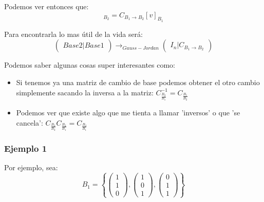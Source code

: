 \documentclass[12pt]{report}							    %
\begin{document}
        Podemos ver entonces que:
        \begin{equation*}
            [v]_{B_2} = C_{B_1 \to B_2} [v]_{B_1}
        \end{equation*}

        Para encontrarla lo mas útil de la vida será:
        \begin{equation}
            \begin{pmatrix}  Base 2  \vert Base 1 \end{pmatrix} \to_{Gauss-Jordan}
            \begin{pmatrix}  I_n  \vert C_{B_1 \to B_2} \end{pmatrix}
        \end{equation}


        Podemos saber algunas cosas super interesantes como:
        \begin{itemize}
            \item Si tenemos ya una matriz de cambio de base podemos obtener el otro cambio simplemente sacando la inversa a la matriz:
            $ C^{-1}_{\frac{B_2}{B_1}} = C_{\frac{B_1}{B_2}} $
            
            \item Podemos ver que existe algo que me tienta a llamar 'inversos' o que 'se cancela': 
            $ C_{\frac{B_3}{B_2}} C_{\frac{B_2}{B_1}} = C_{\frac{B_3}{B_1}} $

        \end{itemize}

        \subsubsection{Ejemplo 1}

        Por ejemplo, sea:
        \begin{equation*}
            B_1 = \left\{
                \begin{pmatrix} 1 \\ 1 \\0 \end{pmatrix}, \begin{pmatrix} 1 \\ 0 \\1 \end{pmatrix},
                \begin{pmatrix} 0 \\ 1 \\1 \end{pmatrix}
            \right\}
        \end{equation*}
\end{document}
